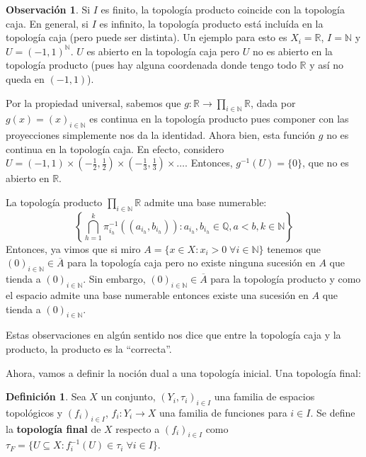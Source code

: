 \documentclass[12pt]{book}
\theoremstyle{definition}
\newtheorem{obs}[teo]{Observación}
\newtheorem{defn}[teo]{Definición}
\newcommand{\RR}{\mathbb{R}}      %
\newcommand{\NN}{\mathbb{N}}
\newcommand{\QQ}{\mathbb{Q}}
\begin{document}
\begin{obs}
Si $I$ es finito, la topología producto coincide con la topología caja. En general, si $I$ es infinito, la topología producto está incluída en la topología caja (pero puede ser distinta). Un ejemplo para esto es $X_i= \RR$, $I=\NN$ y $U=(-1,1)^\NN$. $U$ es abierto en la topología caja pero $U$ no es abierto en la topología producto (pues hay alguna coordenada donde tengo todo $\RR$ y así no queda en $(-1,1)$).

Por la propiedad universal, sabemos que $g:\RR\to\displaystyle\prod_{i\in \NN}\RR$, dada por $g(x)=(x)_{i\in\NN}$ es continua en la topología producto pues componer con las proyecciones simplemente nos da la identidad. Ahora bien, esta función $g$ no es continua en la topología caja. En efecto, considero $U = (-1,1)\times (-\frac{1}{2},\frac{1}{2})\times (-\frac{1}{3},\frac{1}{3})\times \ldots$. Entonces, $g^{-1}(U)=\{0\}$, que no es abierto en $\RR$.

La topología producto $\displaystyle\prod_{i\in\NN}\RR$ admite una base numerable: $$\left\{\displaystyle\bigcap_{h=1}^k \pi_{i_h}^{-1}((a_{i_h},b_{i_h})) : a_{i_h},b_{i_h}\in\QQ , a<b , k\in \NN\right\}$$ Entonces, ya vimos que si miro $A=\{x\in X : x_i > 0 \;\forall i\in\NN\}$ tenemos que $(0)_{i\in\NN}\in\overline{A}$ para la topología caja pero no existe ninguna sucesión en $A$ que tienda a $(0)_{i\in\NN}$. Sin embargo, $(0)_{i\in\NN}\in \overline{A}$ para la topología producto y como el espacio admite una base numerable entonces existe una sucesión en $A$ que tienda a $(0)_{i\in\NN}$.

Estas observaciones en algún sentido nos dice que entre la topología caja y la producto, la producto es la "`correcta"'.
\end{obs}

Ahora, vamos a definir la noción dual a una topología inicial. Una topología final:
\begin{defn}
Sea $X$ un conjunto, $(Y_i,\tau_i)_{i\in I}$ una familia de espacios topológicos y $(f_i)_{i\in I}$, $f_i:Y_i\to X$ una familia de funciones para $i\in I$. Se define la \textbf{topología final} de $X$ respecto a $(f_i)_{i\in I}$ como $\tau_F = \{U\subseteq X : f_i^{-1}(U)\in \tau_i\;\forall i\in I\}$.
\end{defn}
\end{document}
